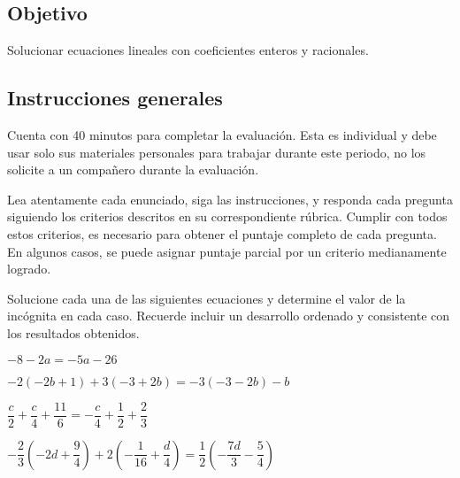 \documentclass[]{srs2}
\begin{document}
\subsection*{Objetivo}
  Solucionar ecuaciones lineales con coeficientes enteros y racionales.

\subsection*{Instrucciones generales}
  Cuenta con 40 minutos para completar la evaluación. Esta es individual y debe usar solo
  sus materiales personales para trabajar durante este periodo, no los solicite a un compañero
  durante la evaluación.

  Lea atentamente cada enunciado, siga las instrucciones, y responda cada
  pregunta siguiendo los criterios descritos en su correspondiente rúbrica. Cumplir
  con todos estos criterios, es necesario para obtener el puntaje completo de cada pregunta.
  En algunos casos, se puede asignar puntaje parcial por un criterio medianamente logrado.

\separador[2mm]

  Solucione cada una de las siguientes ecuaciones y determine el valor de la incógnita
  en cada caso. Recuerde incluir un desarrollo ordenado y consistente con los resultados
  obtenidos.

\begin{preguntas}
  \pregunta $-8-2a=-5a-26$
  \begin{malla}[7]
  \end{malla}
  \usebox{\rubricaUno}

  \pregunta $-2\left(-2b+1\right)+3\left(-3+2b\right)=-3\left(-3-2b\right)-b$
  \begin{malla}[7]
  \end{malla}
  \usebox{\rubricaUno}

  \pregunta $\dfrac{c}{2}+ \dfrac{c}{4} + \dfrac{11}{6}= -\dfrac{c}{4} + \dfrac{1}{2} + \dfrac{2}{3}$
  \begin{malla}[8]
  \end{malla}
  \usebox{\rubricaUno}

  \pregunta $-\dfrac{2}{3}\left(-2d+\dfrac{9}{4}\right) + 2\left(-\dfrac{1}{16}+\dfrac{d}{4}\right)= \dfrac{1}{2}\left(-\dfrac{7d}{3}-\dfrac{5}{4}\right)$
  \begin{malla}[12]
  \end{malla}
  \usebox{\rubricaUno}



\end{preguntas}
\end{document}
